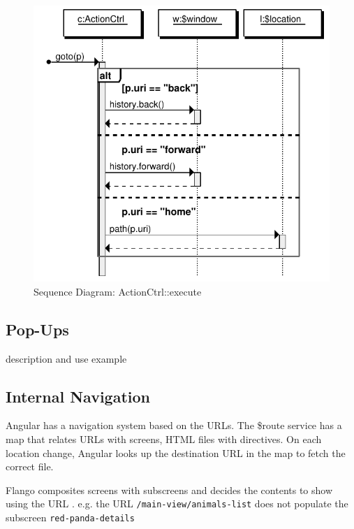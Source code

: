 \begin{figure}[htb]
    \centering
    \includegraphics{figures/design/seqdia/actionCtrl-goto.pdf}
    \caption{Sequence Diagram: ActionCtrl::execute}
    \label{fig:design-seqdia-actionCtrl-goto}
\end{figure}

\FloatBarrier

\subsection{Pop-Ups}
description and use example

\subsection{Internal Navigation}
Angular has a navigation system based on the \acp{URL}.
The \$route service has a map that relates \acp{URL} with screens, \ac{HTML} files with directives.
On each location change, Angular looks up the destination \ac{URL} in the map to fetch the correct file.

Flango \cm composites screens with subscreens and decides the contents to show using the \ac{URL} .
e.g. the \ac{URL} \texttt{/main-view/animals-list} does not populate the subscreen \texttt{red-panda-details}


